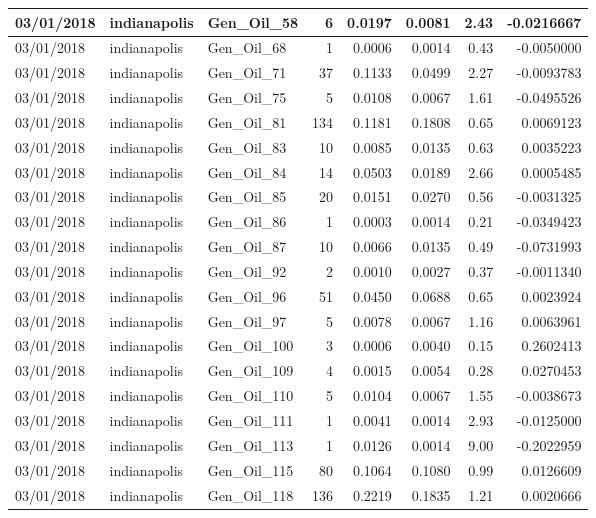 \documentclass[
  letterpaper,
  DIV=11,
  numbers=noendperiod]{scrartcl}
\begin{document}
\begin{tabular}{l|l|l|r|r|r|r|r}
\hline
03/01/2018 & indianapolis & Gen\_Oil\_58 & 6 & 0.0197 & 0.0081 & 2.43 & -0.0216667\\
\hline
03/01/2018 & indianapolis & Gen\_Oil\_68 & 1 & 0.0006 & 0.0014 & 0.43 & -0.0050000\\
\hline
03/01/2018 & indianapolis & Gen\_Oil\_71 & 37 & 0.1133 & 0.0499 & 2.27 & -0.0093783\\
\hline
03/01/2018 & indianapolis & Gen\_Oil\_75 & 5 & 0.0108 & 0.0067 & 1.61 & -0.0495526\\
\hline
03/01/2018 & indianapolis & Gen\_Oil\_81 & 134 & 0.1181 & 0.1808 & 0.65 & 0.0069123\\
\hline
03/01/2018 & indianapolis & Gen\_Oil\_83 & 10 & 0.0085 & 0.0135 & 0.63 & 0.0035223\\
\hline
03/01/2018 & indianapolis & Gen\_Oil\_84 & 14 & 0.0503 & 0.0189 & 2.66 & 0.0005485\\
\hline
03/01/2018 & indianapolis & Gen\_Oil\_85 & 20 & 0.0151 & 0.0270 & 0.56 & -0.0031325\\
\hline
03/01/2018 & indianapolis & Gen\_Oil\_86 & 1 & 0.0003 & 0.0014 & 0.21 & -0.0349423\\
\hline
03/01/2018 & indianapolis & Gen\_Oil\_87 & 10 & 0.0066 & 0.0135 & 0.49 & -0.0731993\\
\hline
03/01/2018 & indianapolis & Gen\_Oil\_92 & 2 & 0.0010 & 0.0027 & 0.37 & -0.0011340\\
\hline
03/01/2018 & indianapolis & Gen\_Oil\_96 & 51 & 0.0450 & 0.0688 & 0.65 & 0.0023924\\
\hline
03/01/2018 & indianapolis & Gen\_Oil\_97 & 5 & 0.0078 & 0.0067 & 1.16 & 0.0063961\\
\hline
03/01/2018 & indianapolis & Gen\_Oil\_100 & 3 & 0.0006 & 0.0040 & 0.15 & 0.2602413\\
\hline
03/01/2018 & indianapolis & Gen\_Oil\_109 & 4 & 0.0015 & 0.0054 & 0.28 & 0.0270453\\
\hline
03/01/2018 & indianapolis & Gen\_Oil\_110 & 5 & 0.0104 & 0.0067 & 1.55 & -0.0038673\\
\hline
03/01/2018 & indianapolis & Gen\_Oil\_111 & 1 & 0.0041 & 0.0014 & 2.93 & -0.0125000\\
\hline
03/01/2018 & indianapolis & Gen\_Oil\_113 & 1 & 0.0126 & 0.0014 & 9.00 & -0.2022959\\
\hline
03/01/2018 & indianapolis & Gen\_Oil\_115 & 80 & 0.1064 & 0.1080 & 0.99 & 0.0126609\\
\hline
03/01/2018 & indianapolis & Gen\_Oil\_118 & 136 & 0.2219 & 0.1835 & 1.21 & 0.0020666\\

\end{tabular}
\end{document}
